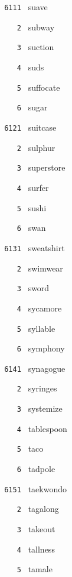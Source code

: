\documentclass[11pt]{article}
\begin{document}
\begin{multicols}{6}
\small
\noindent \texttt{ 6111 } suave  \par
\noindent \texttt{ \ \ \ 2 } subway  \par
\noindent \texttt{ \ \ \ 3 } suction  \par
\noindent \texttt{ \ \ \ 4 } suds  \par
\noindent \texttt{ \ \ \ 5 } suffocate  \par
\noindent \texttt{ \ \ \ 6 } sugar  \par
\vspace{3mm}
\noindent \texttt{ 6121 } suitcase  \par
\noindent \texttt{ \ \ \ 2 } sulphur  \par
\noindent \texttt{ \ \ \ 3 } superstore  \par
\noindent \texttt{ \ \ \ 4 } surfer  \par
\noindent \texttt{ \ \ \ 5 } sushi  \par
\noindent \texttt{ \ \ \ 6 } swan  \par
\vspace{3mm}
\noindent \texttt{ 6131 } sweatshirt  \par
\noindent \texttt{ \ \ \ 2 } swimwear  \par
\noindent \texttt{ \ \ \ 3 } sword  \par
\noindent \texttt{ \ \ \ 4 } sycamore  \par
\noindent \texttt{ \ \ \ 5 } syllable  \par
\noindent \texttt{ \ \ \ 6 } symphony  \par
\vspace{3mm}
\noindent \texttt{ 6141 } synagogue  \par
\noindent \texttt{ \ \ \ 2 } syringes  \par
\noindent \texttt{ \ \ \ 3 } systemize  \par
\noindent \texttt{ \ \ \ 4 } tablespoon  \par
\noindent \texttt{ \ \ \ 5 } taco  \par
\noindent \texttt{ \ \ \ 6 } tadpole  \par
\vspace{3mm}
\noindent \texttt{ 6151 } taekwondo  \par
\noindent \texttt{ \ \ \ 2 } tagalong  \par
\noindent \texttt{ \ \ \ 3 } takeout  \par
\noindent \texttt{ \ \ \ 4 } tallness  \par
\noindent \texttt{ \ \ \ 5 } tamale  \par

\end{multicols}
\end{document}
